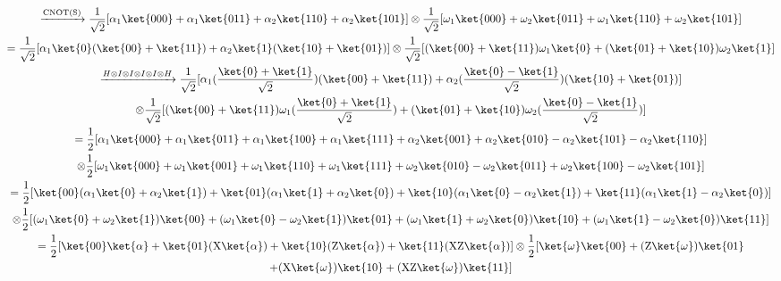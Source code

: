 \documentclass[]{article}
\begin{document}
\begin{enumerate}
        \begin{gather*}
          \xrightarrow{\text{CNOT(S)}}  \frac{1}{\sqrt{2}}[\alpha_1 \ket{000} + \alpha_1 \ket{011} + 
          \alpha_2 \ket{110} + \alpha_2 \ket{101}]
          \otimes \frac{1}{\sqrt{2}}[\omega_1 \ket{000} + \omega_2 \ket{011} + 
          \omega_1 \ket{110} + \omega_2 \ket{101}]\\
          = \frac{1}{\sqrt{2}}[\alpha_1 \ket{0}(\ket{00} + \ket{11}) + \alpha_2 \ket{1}(\ket{10} + \ket{01})]
          \otimes \frac{1}{\sqrt{2}}[(\ket{00} + \ket{11}) \omega_1 \ket{0} + (\ket{01} + \ket{10}) \omega_2 \ket{1}]\\
          \xrightarrow{H \otimes I \otimes I \otimes I \otimes I \otimes H}
          \frac{1}{\sqrt{2}}[\alpha_1 (\frac{\ket{0} + \ket{1}}{\sqrt{2}}) (\ket{00} + \ket{11}) 
          + \alpha_2 (\frac{\ket{0} - \ket{1}}{\sqrt{2}})(\ket{10} + \ket{01})] \\
          \otimes \frac{1}{\sqrt{2}}[(\ket{00} + \ket{11}) \omega_1 (\frac{\ket{0} + \ket{1}}{\sqrt{2}})
          + (\ket{01} + \ket{10}) \omega_2 (\frac{\ket{0} - \ket{1}}{\sqrt{2}})]\\
          = \frac{1}{2} [\alpha_1 \ket{000} + \alpha_1 \ket{011} + \alpha_1 \ket{100} + \alpha_1 \ket{111}
          + \alpha_2 \ket{001} + \alpha_2 \ket{010} - \alpha_2 \ket{101} - \alpha_2 \ket{110}]\\
          \otimes \frac{1}{2}[\omega_1 \ket{000} + \omega_1 \ket{001} + \omega_1 \ket{110} + \omega_1 \ket{111}
          + \omega_2 \ket{010} - \omega_2 \ket{011} + \omega_2 \ket{100} - \omega_2 \ket{101}]\\
          = \frac{1}{2}[\ket{00}(\alpha_1 \ket{0} + \alpha_2 \ket{1}) + \ket{01}(\alpha_1 \ket{1} + \alpha_2 \ket{0})
          + \ket{10}(\alpha_1 \ket{0} - \alpha_2 \ket{1}) + \ket{11}(\alpha_1 \ket{1} - \alpha_2 \ket{0})]\\
          \otimes \frac{1}{2}[(\omega_1 \ket{0} + \omega_2 \ket{1})\ket{00} 
          + (\omega_1 \ket{0} - \omega_2 \ket{1})\ket{01}
          + (\omega_1 \ket{1} + \omega_2 \ket{0})\ket{10} + (\omega_1 \ket{1} - \omega_2 \ket{0})\ket{11}]\\
          = \frac{1}{2}[\ket{00} \ket{\alpha} + \ket{01} (\text{X} \ket{\alpha}) + \ket{10} (\text{Z} \ket{\alpha})
          + \ket{11} (\text{XZ} \ket{\alpha})]
          \otimes \frac{1}{2}[\ket{\omega} \ket{00} + (\text{Z} \ket{\omega}) \ket{01}\\
          + (\text{X} \ket{\omega}) \ket{10} + (\text{XZ} \ket{\omega}) \ket{11}]\\
        \end{gather*}


    \end{enumerate}
\end{document}
